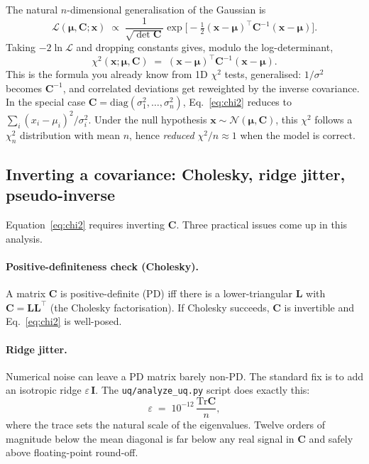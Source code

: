 \documentclass[12pt]{article}
\newcommand{\T}{^{\!\top}}
\newcommand{\diag}{\mathrm{diag}}
\newcommand{\Tr}{\mathrm{Tr}}
\begin{document}
The natural $n$-dimensional generalisation of the Gaussian is
\begin{equation}
\mathcal{L}(\boldsymbol{\mu}, \mathbf{C}; \mathbf{x})
\;\propto\;
\frac{1}{\sqrt{\det\mathbf{C}}}
\exp\!\Big[\!-\tfrac{1}{2}(\mathbf{x}-\boldsymbol{\mu})\T \mathbf{C}^{-1} (\mathbf{x}-\boldsymbol{\mu})\Big].
\label{eq:mvn}
\end{equation}
Taking $-2\ln\mathcal{L}$ and dropping constants gives, modulo the
log-determinant,
\begin{equation}
\chi^{2}(\mathbf{x};\boldsymbol{\mu}, \mathbf{C})
\;=\; (\mathbf{x}-\boldsymbol{\mu})\T \mathbf{C}^{-1} (\mathbf{x}-\boldsymbol{\mu}).
\label{eq:chi2}
\end{equation}
This is the formula you already know from 1D $\chi^{2}$ tests,
generalised: $1/\sigma^{2}$ becomes $\mathbf{C}^{-1}$, and correlated
deviations get reweighted by the inverse covariance. In the special
case $\mathbf{C} = \diag(\sigma_{1}^{2},\dots,\sigma_{n}^{2})$,
Eq.~\eqref{eq:chi2} reduces to $\sum_{i}(x_{i}-\mu_{i})^{2}/\sigma_{i}^{2}$.
Under the null hypothesis $\mathbf{x}\sim\mathcal{N}(\boldsymbol{\mu},
\mathbf{C})$, this $\chi^{2}$ follows a $\chi^{2}_{n}$ distribution
with mean $n$, hence \emph{reduced} $\chi^{2}/n \approx 1$ when the
model is correct.

\subsection{Inverting a covariance: Cholesky, ridge jitter, pseudo-inverse}
\label{sec:invert}

Equation~\eqref{eq:chi2} requires inverting $\mathbf{C}$. Three
practical issues come up in this analysis.

\paragraph{Positive-definiteness check (Cholesky).}
A matrix $\mathbf{C}$ is positive-definite (PD) iff there is a
lower-triangular $\mathbf{L}$ with $\mathbf{C}=\mathbf{L}\mathbf{L}\T$
(the Cholesky factorisation). If Cholesky succeeds, $\mathbf{C}$ is
invertible and Eq.~\eqref{eq:chi2} is well-posed.

\paragraph{Ridge jitter.}
Numerical noise can leave a PD matrix barely non-PD. The standard fix
is to add an isotropic ridge $\varepsilon\, \mathbf{I}$. The
\texttt{uq/analyze\_uq.py} script does exactly this:
\begin{equation}
\varepsilon \;=\; 10^{-12} \,\frac{\Tr\mathbf{C}}{n},
\end{equation}
where the trace sets the natural scale of the eigenvalues. Twelve
orders of magnitude below the mean diagonal is far below any real
signal in $\mathbf{C}$ and safely above floating-point round-off.
\end{document}
